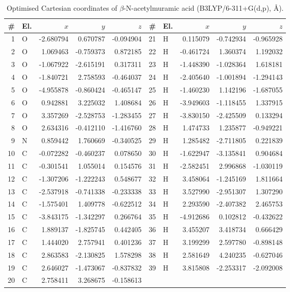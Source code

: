 \documentclass[11pt,a4paper]{article}
\begin{document}
\begin{table}[htbp]
\centering
\caption{Optimised Cartesian coordinates of $\beta$-N-acetylmuramic acid
(B3LYP/6-311+G(d,p), \AA).}
\small
\begin{tabular}{rlrrr@{\hskip 2em}rlrrr}
\toprule
\# & El. & $x$ & $y$ & $z$ & \# & El. & $x$ & $y$ & $z$ \\
\midrule
1 & O & -2.680794 & 0.670787 & -0.094904 & 21 & H & 0.115079 & -0.742934 & -0.965928 \\
2 & O & 1.069463 & -0.759373 & 0.872185 & 22 & H & -0.461724 & 1.360374 & 1.192032 \\
3 & O & -1.067922 & -2.615191 & 0.317311 & 23 & H & -1.448390 & -1.028364 & 1.618181 \\
4 & O & -1.840721 & 2.758593 & -0.464037 & 24 & H & -2.405640 & -1.001894 & -1.294143 \\
5 & O & -4.955878 & -0.860424 & -0.465147 & 25 & H & -1.460230 & 1.142196 & -1.687055 \\
6 & O & 0.942881 & 3.225032 & 1.408684 & 26 & H & -3.949603 & -1.118455 & 1.337915 \\
7 & O & 3.357269 & -2.528753 & -1.283455 & 27 & H & -3.830150 & -2.425509 & 0.133294 \\
8 & O & 2.634316 & -0.412110 & -1.416760 & 28 & H & 1.474733 & 1.235877 & -0.949221 \\
9 & N & 0.859442 & 1.760669 & -0.340525 & 29 & H & 1.285482 & -2.711805 & 0.221839 \\
10 & C & -0.072282 & -0.460237 & 0.078650 & 30 & H & -1.622947 & -3.135841 & 0.904684 \\
11 & C & -0.301541 & 1.055014 & 0.154576 & 31 & H & -2.582451 & 2.996868 & -1.030119 \\
12 & C & -1.307206 & -1.222243 & 0.548677 & 32 & H & 3.458064 & -1.245169 & 1.811664 \\
13 & C & -2.537918 & -0.741338 & -0.233338 & 33 & H & 3.527990 & -2.951307 & 1.307290 \\
14 & C & -1.575401 & 1.409778 & -0.622512 & 34 & H & 2.293590 & -2.407382 & 2.465753 \\
15 & C & -3.843175 & -1.342297 & 0.266764 & 35 & H & -4.912686 & 0.102812 & -0.432622 \\
16 & C & 1.889137 & -1.825745 & 0.442405 & 36 & H & 3.455207 & 3.418734 & 0.666429 \\
17 & C & 1.444020 & 2.757941 & 0.401236 & 37 & H & 3.199299 & 2.597780 & -0.898148 \\
18 & C & 2.863583 & -2.130825 & 1.578298 & 38 & H & 2.581649 & 4.240235 & -0.627046 \\
19 & C & 2.646027 & -1.473067 & -0.837832 & 39 & H & 3.815808 & -2.253317 & -2.092008 \\
20 & C & 2.758411 & 3.268675 & -0.158613 &  & & & & \\
\bottomrule
\end{tabular}
\end{table}
\end{document}
